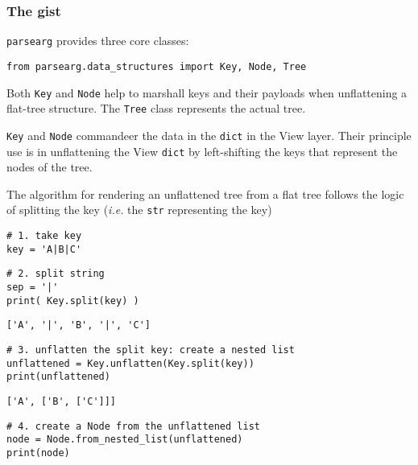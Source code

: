 \documentclass[10pt]{amsart}
\numberwithin{equation}{section}
\begin{document}
\subsubsection{The gist}
\label{sec:orgbcc6c86}
\texttt{parsearg} provides three core classes:
\begin{verbatim}
from parsearg.data_structures import Key, Node, Tree
\end{verbatim}

Both \texttt{Key} and \texttt{Node} help to marshall keys and their payloads when 
unflattening a flat-tree structure. The \texttt{Tree} class represents the
actual tree.  

\texttt{Key} and \texttt{Node} commandeer the data in the \texttt{dict} in the View layer.
Their principle use is in unflattening the View \texttt{dict} by left-shifting the
keys that represent the nodes of the tree.

The algorithm for rendering an unflattened tree from a flat tree
follows the logic of splitting the key (\emph{i.e.} the \texttt{str} representing the key)

\begin{verbatim}
# 1. take key
key = 'A|B|C' 
\end{verbatim}

\begin{verbatim}
# 2. split string 
sep = '|'
print( Key.split(key) )
\end{verbatim}

\begin{verbatim}
['A', '|', 'B', '|', 'C']
\end{verbatim}


\begin{verbatim}
# 3. unflatten the split key: create a nested list
unflattened = Key.unflatten(Key.split(key))
print(unflattened)
\end{verbatim}

\begin{verbatim}
['A', ['B', ['C']]]
\end{verbatim}


\begin{verbatim}
# 4. create a Node from the unflattened list
node = Node.from_nested_list(unflattened)
print(node)
\end{verbatim}
\end{document}
